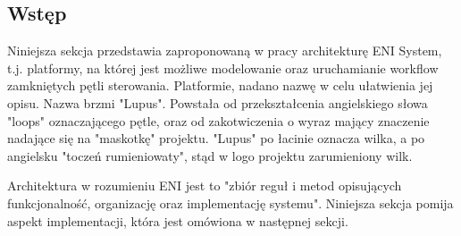 \subsection{Wstęp}

Niniejsza sekcja przedstawia zaproponowaną w pracy architekturę ENI System, t.j. platformy, na której jest możliwe modelowanie oraz uruchamianie workflow zamkniętych pętli sterowania. Platformie, nadano nazwę w celu ułatwienia jej opisu. Nazwa brzmi "Lupus". Powstała od przekształcenia angielskiego słowa "loops" oznaczającego pętle, oraz od zakotwiczenia o wyraz mający znaczenie nadające się na "maskotkę" projektu. "Lupus" po łacinie oznacza wilka, a po angielsku "toczeń rumieniowaty", stąd w logo projektu zarumieniony wilk. 

Architektura w rozumieniu ENI jest to "zbiór reguł i metod opisujących funkcjonalność, organizację oraz implementację systemu". Niniejsza sekcja pomija aspekt implementacji, która jest omówiona w następnej sekcji. 

